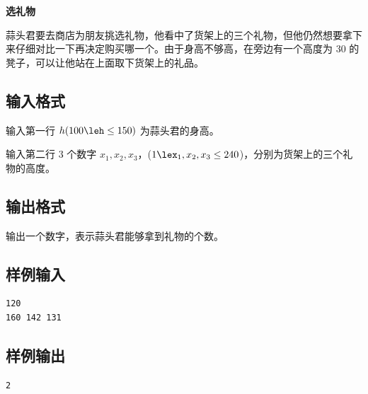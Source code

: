 \documentclass{article}
\newcommand{\problemname}[1]{\begin{center}\Large\bfseries #1\end{center}}
\begin{document}
\problemname{选礼物}

蒜头君要去商店为朋友挑选礼物，他看中了货架上的三个礼物，但他仍然想要拿下来仔细对比一下再决定购买哪一个。由于身高不够高，在旁边有一个高度为 $30$ 的凳子，可以让他站在上面取下货架上的礼品。

\subsection*{输入格式}
输入第一行 $h(100\leh\le150)$ 为蒜头君的身高。

输入第二行 $3$ 个数字 $x_{1},x_{2},x_{3}$，($1\lex_{1},x_{2},x_{3}\le240$)，分别为货架上的三个礼物的高度。

\subsection*{输出格式}
输出一个数字，表示蒜头君能够拿到礼物的个数。

\subsection*{样例输入}
\begin{verbatim}
120
160 142 131
\end{verbatim}

\subsection*{样例输出}
\begin{verbatim}
2
\end{verbatim}
\end{document}
